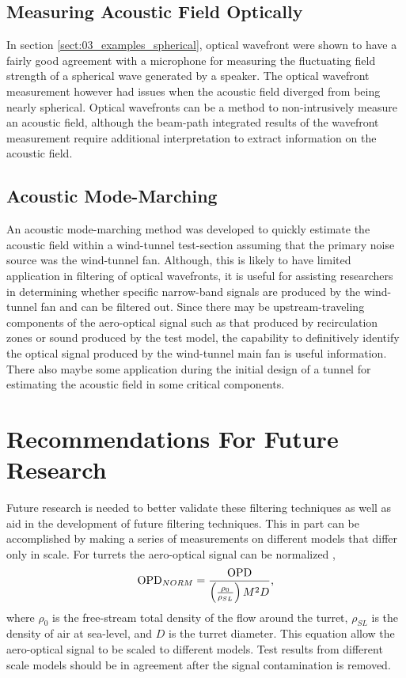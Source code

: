 \subsection{Measuring Acoustic Field Optically}
In section \ref{sect:03_examples_spherical}, optical wavefront were shown to have a fairly good agreement with a microphone for measuring the fluctuating field strength of a spherical wave generated by a speaker.
The optical wavefront measurement however had issues when the acoustic field diverged from being nearly spherical.
Optical wavefronts can be a method to non-intrusively measure an acoustic field, although the beam-path integrated results of the wavefront measurement require additional interpretation to extract information on the acoustic field.

\subsection{Acoustic Mode-Marching}
An acoustic mode-marching method was developed to quickly estimate the acoustic field within a wind-tunnel test-section assuming that the primary noise source was the wind-tunnel fan.
Although, this is likely to have limited application in filtering of optical wavefronts, it is useful for assisting researchers in determining whether specific narrow-band signals are produced by the wind-tunnel fan and can be filtered out.
Since there may be upstream-traveling components of the aero-optical signal such as that produced by recirculation zones or sound produced by the test model, the capability to definitively identify the optical signal produced by the wind-tunnel main fan is useful information.
There also maybe some application during the initial design of a tunnel for estimating the acoustic field in some critical components.

\section{Recommendations For Future Research}

Future research is needed to better validate these filtering techniques as well as aid in the development of future filtering techniques.
This in part can be accomplished by making a series of measurements on different models that differ only in scale.
For turrets the aero-optical signal can be normalized \cite{Jumper-2013-8KtN3pue},
\begin{equation}
  \operatorname{OPD}_{NORM} = \frac{\operatorname{OPD}}{\left(\frac{\rho_0}{\rho_{SL}}\right)M^2D} \textrm{,}
\end{equation}
where $\rho_0$ is the free-stream total density of the flow around the turret, $\rho_{SL}$ is the density of air at sea-level, and $D$ is the turret diameter.
This equation allow the aero-optical signal to be scaled to different models.
Test results from different scale models should be in agreement after the signal contamination is removed.

